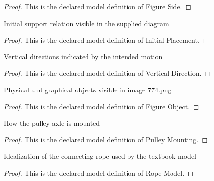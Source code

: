 \begin{proof}
  This is the declared model definition of Figure Side.
\end{proof}
\begin{definition}
  \label{def:physics:phyx-mini-0774:phyxminiproblems-problemphyxmini0774-initialplacement}
  Initial support relation visible in the supplied diagram
\end{definition}
\begin{proof}
  This is the declared model definition of Initial Placement.
\end{proof}
\begin{definition}
  \label{def:physics:phyx-mini-0774:phyxminiproblems-problemphyxmini0774-verticaldirection}
  Vertical directions indicated by the intended motion
\end{definition}
\begin{proof}
  This is the declared model definition of Vertical Direction.
\end{proof}
\begin{definition}
  \label{def:physics:phyx-mini-0774:phyxminiproblems-problemphyxmini0774-figureobject}
  Physical and graphical objects visible in image 774.png
\end{definition}
\begin{proof}
  This is the declared model definition of Figure Object.
\end{proof}
\begin{definition}
  \label{def:physics:phyx-mini-0774:phyxminiproblems-problemphyxmini0774-pulleymounting}
  How the pulley axle is mounted
\end{definition}
\begin{proof}
  This is the declared model definition of Pulley Mounting.
\end{proof}
\begin{definition}
  \label{def:physics:phyx-mini-0774:phyxminiproblems-problemphyxmini0774-ropemodel}
  Idealization of the connecting rope used by the textbook model
\end{definition}
\begin{proof}
  This is the declared model definition of Rope Model.
\end{proof}
